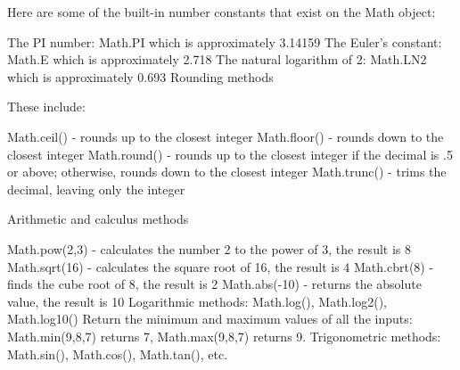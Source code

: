 Here are some of the built-in number constants that exist on the Math object: 

The PI number: Math.PI which is approximately 3.14159
The Euler's constant: Math.E which is approximately 2.718
The natural logarithm of 2: Math.LN2 which is approximately 0.693
Rounding methods

These include: 

 Math.ceil() - rounds up to the closest integer 
 Math.floor() - rounds down to the closest integer 
 Math.round() - rounds up to the closest integer if the decimal is .5 or above; otherwise, rounds down to the closest integer 
 Math.trunc() - trims the decimal, leaving only the integer


Arithmetic and calculus methods 

Math.pow(2,3) - calculates the number 2 to the power of 3, the result is 8 
Math.sqrt(16) - calculates the square root of 16, the result is 4 
Math.cbrt(8) - finds the cube root of 8, the result is 2 
Math.abs(-10) - returns the absolute value, the result is 10 
Logarithmic methods: Math.log(), Math.log2(), Math.log10() 
Return the minimum and maximum values of all the inputs: Math.min(9,8,7) returns 7, Math.max(9,8,7) returns 9.
Trigonometric methods: Math.sin(), Math.cos(), Math.tan(), etc.